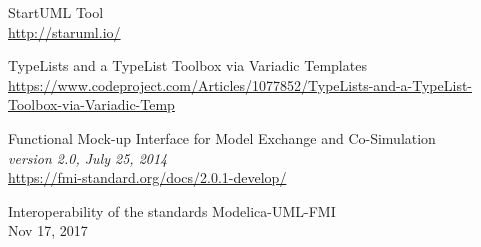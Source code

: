 \documentclass[a4paper,12pt]{report}
\begin{document}
\begin{thebibliography}{4}
	StartUML Tool \\
	\url{http://staruml.io/}
	
	TypeLists and a TypeList Toolbox via Variadic Templates \\
	\url{https://www.codeproject.com/Articles/1077852/TypeLists-and-a-TypeList-Toolbox-via-Variadic-Temp}
	

	
	Functional Mock-up Interface for Model Exchange and Co-Simulation \\
	\emph{version 2.0, July 25, 2014}  \\
	\url{https://fmi-standard.org/docs/2.0.1-develop/}
	
	Interoperability of the standards Modelica-UML-FMI \\ 
	Nov 17, 2017 \\
	

	
\end{thebibliography}
\end{document}

